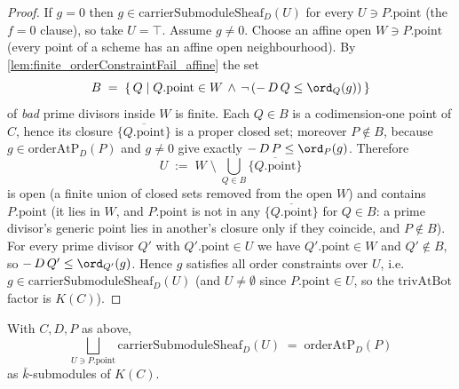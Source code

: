 \begin{proof}
  \leanok
  If \(g = 0\) then \(g \in \mathrm{carrierSubmoduleSheaf}_D(U)\) for every
  \(U \ni P.\mathrm{point}\) (the \(f = 0\) clause), so take \(U = \top\).
  Assume \(g \ne 0\). Choose an affine open \(W \ni P.\mathrm{point}\) (every
  point of a scheme has an affine open neighbourhood). By
  \cref{lem:finite_orderConstraintFail_affine} the set
  \[
    B \;=\; \{\, Q \mid Q.\mathrm{point} \in W \,\land\,
      \neg\,(-\,D\,Q \le \ord_Q(g)) \,\}
  \]
  of \emph{bad} prime divisors inside \(W\) is finite. Each \(Q \in B\) is a
  codimension-one point of \(C\), hence its closure \(\overline{\{Q.\mathrm
  {point}\}}\) is a proper closed set; moreover \(P \notin B\), because
  \(g \in \mathrm{orderAtP}_D(P)\) and \(g \ne 0\) give exactly
  \(-\,D\,P \le \ord_P(g)\). Therefore
  \[
    U \;:=\; W \;\setminus\; \bigcup_{Q \in B}
      \overline{\{Q.\mathrm{point}\}}
  \]
  is open (a finite union of closed sets removed from the open \(W\)) and
  contains \(P.\mathrm{point}\) (it lies in \(W\), and \(P.\mathrm{point}\) is
  not in any \(\overline{\{Q.\mathrm{point}\}}\) for \(Q \in B\): a prime
  divisor's generic point lies in another's closure only if they coincide, and
  \(P \notin B\)). For every prime divisor \(Q'\) with \(Q'.\mathrm{point} \in
  U\) we have \(Q'.\mathrm{point} \in W\) and \(Q' \notin B\), so
  \(-\,D\,Q' \le \ord_{Q'}(g)\). Hence \(g\) satisfies all order constraints
  over \(U\), i.e.\ \(g \in \mathrm{carrierSubmoduleSheaf}_D(U)\) (and \(U \ne
  \emptyset\) since \(P.\mathrm{point} \in U\), so the \(\mathrm{trivAtBot}\)
  factor is \(K(C)\)).
\end{proof}

\begin{lemma}

  \label{lem:iSup_carrierSubmoduleSheaf_eq_orderAtPSubmodule}
  With \(C, D, P\) as above,
  \[
    \bigsqcup_{U \ni P.\mathrm{point}}
      \mathrm{carrierSubmoduleSheaf}_D(U) \;=\; \mathrm{orderAtP}_D(P)
  \]
  as \(\bar k\)-submodules of \(K(C)\).
\end{lemma}

